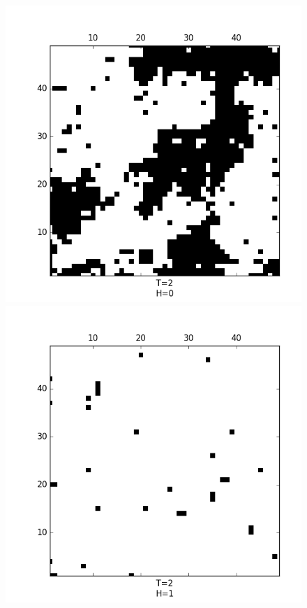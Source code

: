 \documentclass[slovene,11pt,a4paper]{article}
\numberwithin{equation}{section} %
\numberwithin{figure}{section} %
\numberwithin{table}{section} %
\begin{document}
\begin{figure}[!ht]
\begin{minipage}{0.5\textwidth}
\end{minipage}
\begin{minipage}{0.5\textwidth}
\centering
\includegraphics[scale=0.5]{slike/zunanje0T2plus.png}
\end{minipage}\hfill
\begin{minipage}{0.5\textwidth}
\centering
\includegraphics[scale=0.5]{slike/zunanje1T2plus.png}

\end{minipage}
\end{figure}
\end{document}
